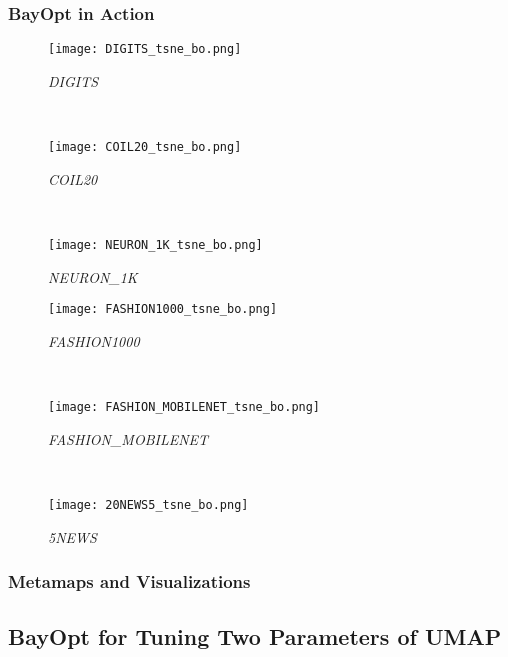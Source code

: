 \subsubsection*{BayOpt in Action}

\begin{figure*}
\centering
\begin{subfigure}[b]{.32\textwidth}
    \centering
    \texttt{[image: DIGITS\_tsne\_bo.png]}
    \caption{\emph{DIGITS}}
\end{subfigure}
~
\begin{subfigure}[b]{.32\textwidth}
    \centering
    \texttt{[image: COIL20\_tsne\_bo.png]}
    \caption{\emph{COIL20}}
\end{subfigure}
~
\begin{subfigure}[b]{.32\textwidth}
    \centering
    \texttt{[image: NEURON\_1K\_tsne\_bo.png]}
    \caption{\emph{NEURON\_1K}}
\end{subfigure}

\vfill

\begin{subfigure}[b]{.32\textwidth}
    \centering
    \texttt{[image: FASHION1000\_tsne\_bo.png]}
    \caption{\emph{FASHION1000}}
\end{subfigure}
~
\begin{subfigure}[b]{.32\textwidth}
    \centering
    \texttt{[image: FASHION\_MOBILENET\_tsne\_bo.png]}
    \caption{\emph{FASHION\_MOBILENET}}
\end{subfigure}
~
\begin{subfigure}[b]{.32\textwidth}
    \centering
    \texttt{[image: 20NEWS5\_tsne\_bo.png]}
    \caption{\emph{5NEWS}}
\end{subfigure}

\end{figure*}


\subsubsection*{Metamaps and Visualizations}


\subsection{BayOpt for Tuning Two Parameters of UMAP}


